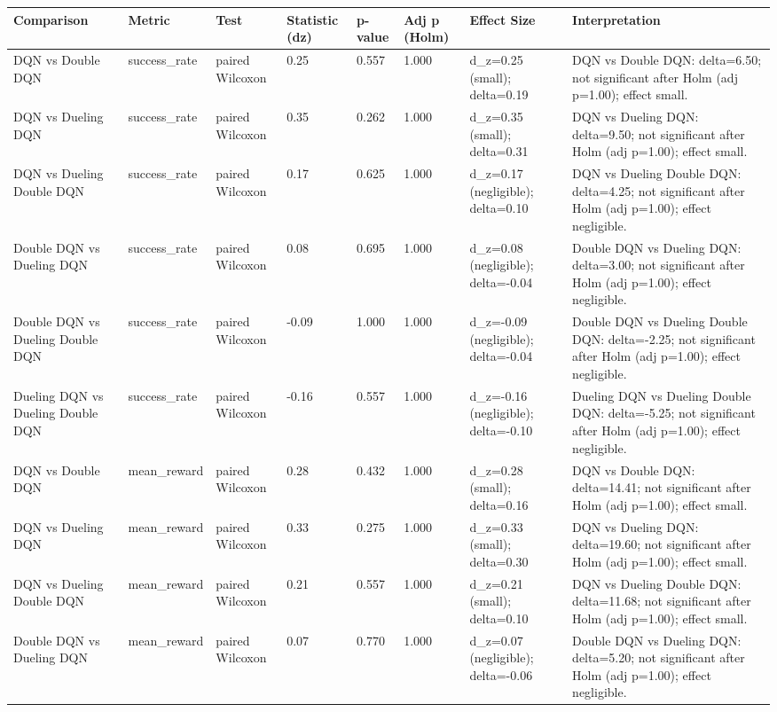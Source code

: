 \begin{tabular}{llllllll}
\toprule
Comparison & Metric & Test & Statistic (dz) & p-value & Adj p (Holm) & Effect Size & Interpretation \\
\midrule
DQN vs Double DQN & success\_rate & paired Wilcoxon & 0.25 & 0.557 & 1.000 & d\_z=0.25 (small); delta=0.19 & DQN vs Double DQN: delta=6.50; not significant after Holm (adj p=1.00); effect small. \\
DQN vs Dueling DQN & success\_rate & paired Wilcoxon & 0.35 & 0.262 & 1.000 & d\_z=0.35 (small); delta=0.31 & DQN vs Dueling DQN: delta=9.50; not significant after Holm (adj p=1.00); effect small. \\
DQN vs Dueling Double DQN & success\_rate & paired Wilcoxon & 0.17 & 0.625 & 1.000 & d\_z=0.17 (negligible); delta=0.10 & DQN vs Dueling Double DQN: delta=4.25; not significant after Holm (adj p=1.00); effect negligible. \\
Double DQN vs Dueling DQN & success\_rate & paired Wilcoxon & 0.08 & 0.695 & 1.000 & d\_z=0.08 (negligible); delta=-0.04 & Double DQN vs Dueling DQN: delta=3.00; not significant after Holm (adj p=1.00); effect negligible. \\
Double DQN vs Dueling Double DQN & success\_rate & paired Wilcoxon & -0.09 & 1.000 & 1.000 & d\_z=-0.09 (negligible); delta=-0.04 & Double DQN vs Dueling Double DQN: delta=-2.25; not significant after Holm (adj p=1.00); effect negligible. \\
Dueling DQN vs Dueling Double DQN & success\_rate & paired Wilcoxon & -0.16 & 0.557 & 1.000 & d\_z=-0.16 (negligible); delta=-0.10 & Dueling DQN vs Dueling Double DQN: delta=-5.25; not significant after Holm (adj p=1.00); effect negligible. \\
DQN vs Double DQN & mean\_reward & paired Wilcoxon & 0.28 & 0.432 & 1.000 & d\_z=0.28 (small); delta=0.16 & DQN vs Double DQN: delta=14.41; not significant after Holm (adj p=1.00); effect small. \\
DQN vs Dueling DQN & mean\_reward & paired Wilcoxon & 0.33 & 0.275 & 1.000 & d\_z=0.33 (small); delta=0.30 & DQN vs Dueling DQN: delta=19.60; not significant after Holm (adj p=1.00); effect small. \\
DQN vs Dueling Double DQN & mean\_reward & paired Wilcoxon & 0.21 & 0.557 & 1.000 & d\_z=0.21 (small); delta=0.10 & DQN vs Dueling Double DQN: delta=11.68; not significant after Holm (adj p=1.00); effect small. \\
Double DQN vs Dueling DQN & mean\_reward & paired Wilcoxon & 0.07 & 0.770 & 1.000 & d\_z=0.07 (negligible); delta=-0.06 & Double DQN vs Dueling DQN: delta=5.20; not significant after Holm (adj p=1.00); effect negligible. \\

\end{tabular}
